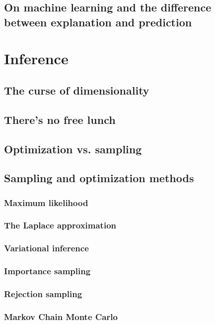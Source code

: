 \documentclass[11pt]{report}
\begin{document}
\subsection{On machine learning and the difference between explanation and prediction}

\section{Inference}
\label{sec:inference}
\subsection{The curse of dimensionality}
\subsection{There's no free lunch}
\subsection{Optimization vs. sampling}
\subsection{Sampling and optimization methods}
\subsubsection{Maximum likelihood}
\subsubsection{The Laplace approximation}
\subsubsection{Variational inference}
\subsubsection{Importance sampling}
\subsubsection{Rejection sampling}
\subsubsection{Markov Chain Monte Carlo}
\end{document}
